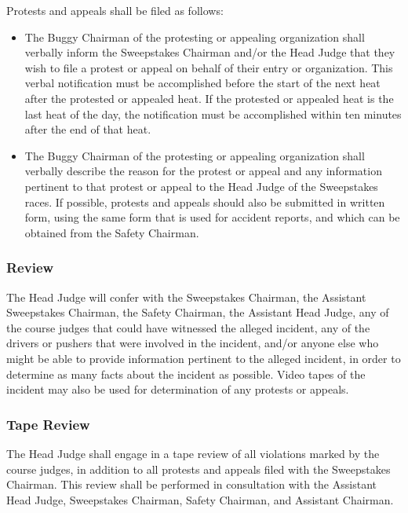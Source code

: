 	Protests and appeals shall be filed as follows:

	\begin{itemize}

		\item
		The Buggy Chairman of the protesting or appealing organization shall verbally inform the Sweepstakes Chairman and/or the Head Judge that they wish to file a protest or appeal on behalf of their entry or organization. This verbal notification must be accomplished before the start of the next heat after the protested or appealed heat. If the protested or appealed heat is the last heat of the day, the notification must be accomplished within ten minutes after the end of that heat.

		\item
		The Buggy Chairman of the protesting or appealing organization shall verbally describe the reason for the protest or appeal and any information pertinent to that protest or appeal to the Head Judge of the Sweepstakes races. If possible, protests and appeals should also be submitted in written form, using the same form that is used for accident reports, and which can be obtained from the Safety Chairman.

	\end{itemize}

\subsubsection{Review}

	The Head Judge will confer with the Sweepstakes Chairman, the Assistant Sweepstakes Chairman, the Safety Chairman, the Assistant Head Judge, any of the course judges that could have witnessed the alleged incident, any of the drivers or pushers that were involved in the incident, and/or anyone else who might be able to provide information pertinent to the alleged incident, in order to determine as many facts about the incident as possible. Video tapes of the incident may also be used for determination of any protests or appeals.

\subsubsection{Tape Review}

	The Head Judge shall engage in a tape review of all violations marked by the course judges, in addition to all protests and appeals filed with the Sweepstakes Chairman. This review shall be performed in	consultation with the Assistant Head Judge, Sweepstakes Chairman, Safety Chairman, and Assistant Chairman.

